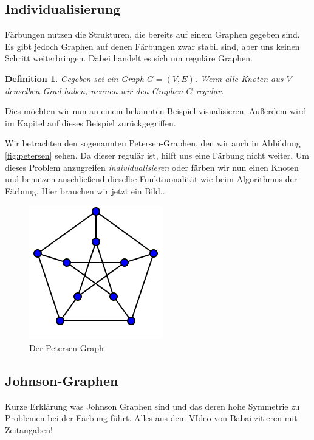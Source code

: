 \documentclass[a4paper]{article}
\newtheorem{definition}{Definition}
\begin{document}
\subsection{Individualisierung}
Färbungen nutzen die Strukturen, die bereits auf einem Graphen gegeben sind. Es gibt jedoch Graphen auf denen Färbungen zwar stabil sind, aber uns keinen Schritt weiterbringen. Dabei handelt es sich um reguläre Graphen.
\begin{definition}
Gegeben sei ein Graph $G = (V,E)$. Wenn alle Knoten aus $V$ denselben Grad haben, nennen wir den Graphen $G$ regulär.
\end{definition}
Dies möchten wir nun an einem bekannten Beispiel visualisieren. Außerdem wird im Kapitel  auf dieses Beispiel zurückgegriffen. 

Wir betrachten den sogenannten Petersen-Graphen, den wir auch in Abbildung \ref{fig:petersen} sehen. Da dieser regulär ist, hilft uns eine Färbung nicht weiter. Um dieses Problem anzugreifen \emph{individualisieren} oder färben wir nun einen Knoten und benutzen anschließend dieselbe Funktiuonalität wie beim Algorithmus der Färbung. Hier brauchen wir jetzt ein Bild...

\begin{figure}
\centering
\includegraphics[scale=0.8]{petersen.png}
\caption{Der Petersen-Graph}\label{fig:isomorph}
\end{figure}

\subsection{Johnson-Graphen}
Kurze Erklärung was Johnson Graphen sind und das deren hohe Symmetrie zu Problemen bei der Färbung führt. Alles aus dem VIdeo von Babai zitieren mit Zeitangaben!
\end{document}
